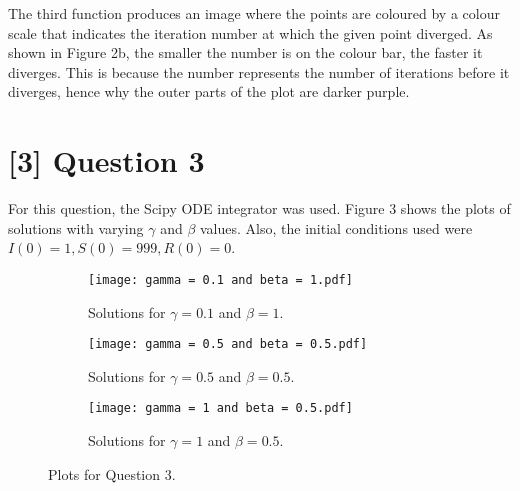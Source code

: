 \documentclass[12pt]{article}
\begin{document}
The third function produces an image where the points are coloured by a colour scale that indicates the iteration number at which the given point diverged. As shown in Figure 2b, the smaller the number is on the colour bar, the faster it diverges. This is because the number represents the number of iterations before it diverges, hence why the outer parts of the plot are darker purple.



\section*{[3] Question 3}

For this question, the Scipy ODE integrator was used. Figure 3 shows the plots of solutions with varying $\gamma$ and $\beta$ values. Also, the initial conditions used were $I(0) = 1, S(0)=999, R(0) = 0$.


\begin{figure*}[h]
        \centering
        \begin{subfigure}[b]{0.49\textwidth}
            \centering
            \texttt{[image: gamma = 0.1 and beta = 1.pdf]}
            \caption[]%
            {{\small Solutions for $\gamma = 0.1$ and $\beta = 1$.}}    
            \label{fig:mean and std of net14}
        \end{subfigure}
        \begin{subfigure}[b]{0.5\textwidth}   
            \centering 
            \texttt{[image: gamma = 0.5 and beta = 0.5.pdf]}
            \caption[]%
            {{\small Solutions for $\gamma = 0.5$ and $\beta = 0.5$.}}    
        \end{subfigure}
        \begin{subfigure}[b]{0.5\textwidth}   
            \centering 
            \texttt{[image: gamma = 1 and beta = 0.5.pdf]}
            \caption[]%
            {{\small Solutions for $\gamma = 1$ and $\beta = 0.5$.}}    
        \end{subfigure}
        \caption[]%
        {\small Plots for Question 3.} 
    \end{figure*}
\end{document}
